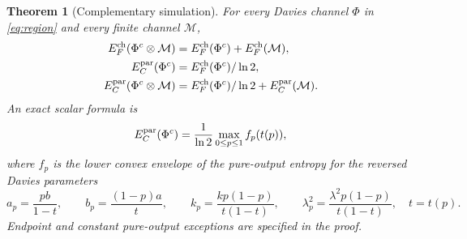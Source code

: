 \documentclass[11pt]{article}
\newtheorem{theorem}{Theorem}
\begin{document}
\begin{theorem}[Complementary simulation]\label{thm:simulation}
For every Davies channel $\Phi$ in \eqref{eq:region} and every finite channel
$\mathcal M$,
\begin{align*}
 E_F^{\rm ch}(\Phi^c\otimes\mathcal M)
   &=E_F^{\rm ch}(\Phi^c)+E_F^{\rm ch}(\mathcal M),\\
 E_C^{\rm par}(\Phi^c)&=E_F^{\rm ch}(\Phi^c)/\ln2,\\
 E_C^{\rm par}(\Phi^c\otimes\mathcal M)
   &=E_F^{\rm ch}(\Phi^c)/\ln2+E_C^{\rm par}(\mathcal M).
\end{align*}
An exact scalar formula is
\begin{equation}\label{eq:simformula}
 E_C^{\rm par}(\Phi^c)=\frac1{\ln2}\max_{0\le p\le1} f_p(t(p)),
\end{equation}
where $f_p$ is the lower convex envelope of the pure-output entropy for the
reversed Davies parameters
\begin{equation}\label{eq:reverse}
 a_p=\frac{pb}{1-t},\qquad b_p=\frac{(1-p)a}{t},\qquad
 k_p=\frac{kp(1-p)}{t(1-t)},\qquad
 \lambda_p^2=\frac{\lambda^2p(1-p)}{t(1-t)},\quad t=t(p).
\end{equation}
Endpoint and constant pure-output exceptions are specified in the proof.
\end{theorem}
\end{document}
